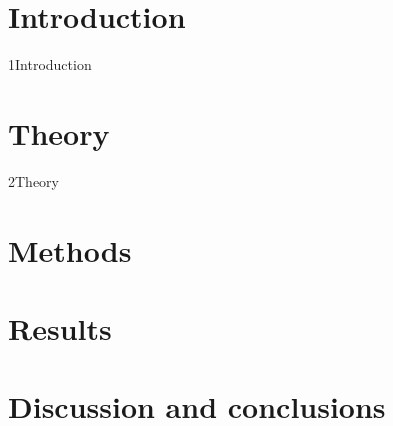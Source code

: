 \documentclass{../Misc/format}
\begin{document}



\tableofcontents

\chapter{Introduction}
{1Introduction}

\chapter{Theory}
{2Theory}

\chapter{Methods}

\chapter{Results}

\chapter{Discussion and conclusions}


\printbibliography
\end{document}
